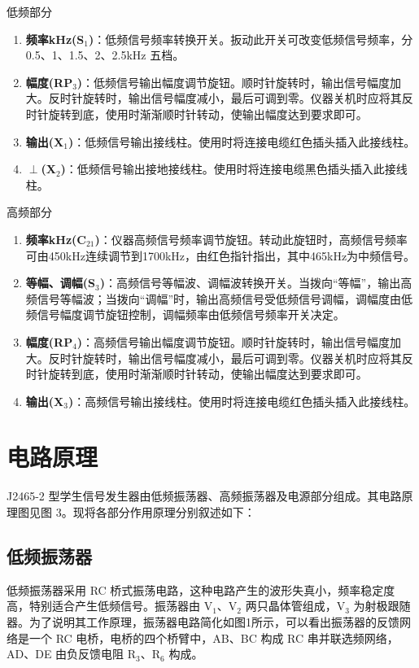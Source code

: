 \documentclass[12pt,UTF8]{ctexbook}
\begin{document}
低频部分

\begin{enumerate}
\item \textbf{频率kHz(S\(_1\))}：低频信号频率转换开关。扳动此开关可改变低频信号频率，分 0.5、1、1.5、2、2.5kHz 五档。
\item \textbf{幅度(RP\(_3\))}：低频信号输出幅度调节旋钮。顺时针旋转时，输出信号幅度加大。反时针旋转时，输出信号幅度减小，最后可调到零。仪器关机时应将其反时针旋转到底，使用时渐渐顺时针转动，使输出幅度达到要求即可。
\item \textbf{输出(X\(_1\))}：低频信号输出接线柱。使用时将连接电缆红色插头插入此接线柱。
\item \textbf{\(\perp\)(X\(_2\))}：低频信号输出接地接线柱。使用时将连接电缆黑色插头插入此接线柱。
\end{enumerate}

高频部分

\begin{enumerate}
\item \textbf{频率kHz(C\(_{21}\))}：仪器高频信号频率调节旋钮。转动此旋钮时，高频信号频率可由450kHz连续调节到1700kHz，由红色指针指出，其中465kHz为中频信号。
\item \textbf{等幅、调幅(S\(_3\))}：高频信号等幅波、调幅波转换开关。当拨向“等幅”，输出高频信号等幅波；当拨向“调幅”时，输出高频信号受低频信号调幅，调幅度由低频信号幅度调节旋钮控制，调幅频率由低频信号频率开关决定。
\item \textbf{幅度(RP\(_4\))}：高频信号输出幅度调节旋钮。顺时针旋转时，输出信号幅度加大。反时针旋转时，输出信号幅度减小，最后可调到零。仪器关机时应将其反时针旋转到底，使用时渐渐顺时针转动，使输出幅度达到要求即可。
\item \textbf{输出(X\(_3\))}：高频信号输出接线柱。使用时将连接电缆红色插头插入此接线柱。
\end{enumerate}
	
\section{电路原理}

J2465-2 型学生信号发生器由低频振荡器、高频振荡器及电源部分组成。其电路原理图见图 3。现将各部分作用原理分别叙述如下：
	
\subsection{低频振荡器}

低频振荡器采用 RC 桥式振荡电路，这种电路产生的波形失真小，频率稳定度高，特别适合产生低频信号。振荡器由 V\(_1\)、V\(_2\) 两只晶体管组成，V\(_3\) 为射极跟随器。为了说明其工作原理，振荡器电路简化如图1所示，可以看出振荡器的反馈网络是一个 RC 电桥，电桥的四个桥臂中，AB、BC 构成 RC 串并联选频网络，AD、DE 由负反馈电阻 R\(_3\)、R\(_6\) 构成。
	
\end{document}
